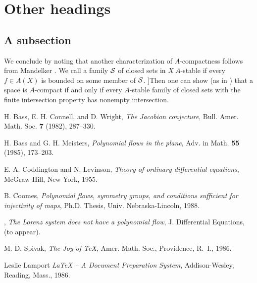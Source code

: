 \begin{figure}
\vskip 7pc
\caption{}
\end{figure}


\section{Other headings}

\subsection{A subsection} 
We conclude by noting that another characterization of $A$-compactness
follows from Mandelker \cite{coddington:orddiffeq}. We call a family $\cal S$ of closed sets in
$X\ A$-stable if every $f\in A(X)$ is bounded on some member of $\cal S$.
]Then one can show (as in \cite{coddington:orddiffeq}) that a space is $A$-compact if and only if 
every $A$-stable family of closed sets with the finite intersection property
has nonempty intersection.

%




\makeatletter \renewcommand{\@biblabel}[1]{\hfill#1.}\makeatother

\begin{thebibliography}{10}

H. Bass, E. H. Connell, and D. Wright,
{\em The Jacobian conjecture}, Bull. Amer. Math. Soc.
 {\bf 7} (1982), 287--330.

H. Bass and G. H. Meisters,
{\em Polynomial flows in the plane}, Adv. in Math.
 {\bf 55} (1985), 173--203.

E. A. Coddington and N. Levinson,
{\em Theory of ordinary differential equations},
McGraw-Hill, New York, 1955.

B. Coomes,
{\em Polynomial flows, symmetry groups, and conditions sufficient for 
        injectivity of maps},
 Ph.D. Thesis, Univ. Nebraska-Lincoln, 1988.

\bysame,
{\em The Lorenz system does not have a polynomial flow},
 {J. Differential Equations}, (to appear).

M. D. Spivak,
{\em The Joy of \TeX{}}, Amer. Math. Soc., Providence, R.~I., 1986.

 Leslie Lamport {\em \LaTeX{} -- A Document Preparation
System}, Addison-Wesley, Reading, Mass., 1986.

\end{thebibliography}



\endinput
%
